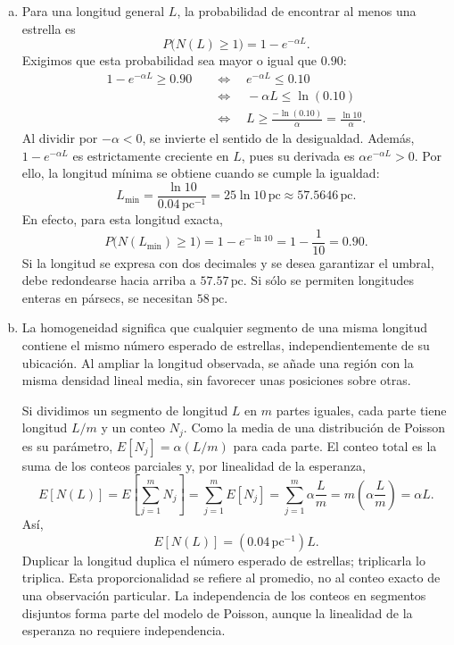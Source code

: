 \documentclass[a4paper]{article}
\begin{document}
\begin{enumerate}[a)]
\item Para una longitud general $L$, la probabilidad de encontrar al menos una estrella es
$$
P\bigl(N(L)\ge1\bigr)=1-e^{-\alpha L}.
$$
Exigimos que esta probabilidad sea mayor o igual que $0.90$:
\begin{align*}
1-e^{-\alpha L}\ge0.90
&\quad\Longleftrightarrow\quad e^{-\alpha L}\le0.10\\
&\quad\Longleftrightarrow\quad -\alpha L\le\ln(0.10)\\
&\quad\Longleftrightarrow\quad L\ge\frac{-\ln(0.10)}{\alpha}
=\frac{\ln 10}{\alpha}.
\end{align*}
Al dividir por $-\alpha<0$, se invierte el sentido de la desigualdad. Además, $1-e^{-\alpha L}$ es estrictamente creciente en $L$, pues su derivada es $\alpha e^{-\alpha L}>0$. Por ello, la longitud mínima se obtiene cuando se cumple la igualdad:
$$
\boxed{L_{\min}=\frac{\ln 10}{0.04\,\mathrm{pc}^{-1}}
=25\ln 10\,\mathrm{pc}
\approx57.5646\,\mathrm{pc}.}
$$
En efecto, para esta longitud exacta,
$$
P\bigl(N(L_{\min})\ge1\bigr)
=1-e^{-\ln 10}=1-\frac{1}{10}=0.90.
$$
Si la longitud se expresa con dos decimales y se desea garantizar el umbral, debe redondearse hacia arriba a $57.57\,\mathrm{pc}$. Si sólo se permiten longitudes enteras en pársecs, se necesitan $58\,\mathrm{pc}$.



\item La homogeneidad significa que cualquier segmento de una misma longitud contiene el mismo número esperado de estrellas, independientemente de su ubicación. Al ampliar la longitud observada, se añade una región con la misma densidad lineal media, sin favorecer unas posiciones sobre otras.

Si dividimos un segmento de longitud $L$ en $m$ partes iguales, cada parte tiene longitud $L/m$ y un conteo $N_j$. Como la media de una distribución de Poisson es su parámetro, $E[N_j]=\alpha(L/m)$ para cada parte. El conteo total es la suma de los conteos parciales y, por linealidad de la esperanza,
$$
E[N(L)]
=E\!\left[\sum_{j=1}^{m}N_j\right]
=\sum_{j=1}^{m}E[N_j]
=\sum_{j=1}^{m}\alpha\frac{L}{m}
=m\left(\alpha\frac{L}{m}\right)
=\alpha L.
$$
Así,
$$
\boxed{E[N(L)]=(0.04\,\mathrm{pc}^{-1})L.}
$$
Duplicar la longitud duplica el número esperado de estrellas; triplicarla lo triplica. Esta proporcionalidad se refiere al promedio, no al conteo exacto de una observación particular. La independencia de los conteos en segmentos disjuntos forma parte del modelo de Poisson, aunque la linealidad de la esperanza no requiere independencia.
\end{enumerate}


 
\end{document}
